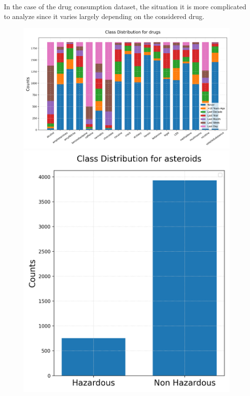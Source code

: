 \documentclass{article}
\begin{document}
In the case of the drug consumption dataset, the situation it is more complicated to analyze since it varies largely depending on the considered drug.

\begin{figure}[h!]
	\centering
	\begin{minipage}[b]{0.99\textwidth}
		\includegraphics[width=\textwidth]{Plots/Inbalance_drugs.png}
	\end{minipage}
	\begin{minipage}[b]{0.32\textwidth}
	\includegraphics[width=\textwidth]{Plots/Inbalance_asteroids.png}

\end{minipage}
\end{figure}
\end{document}
